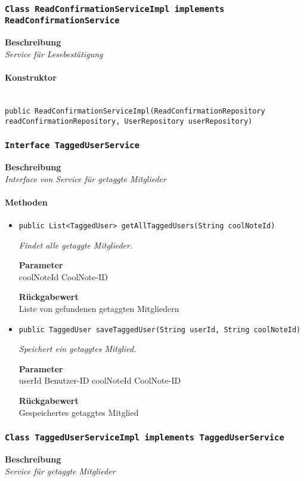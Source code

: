     \subsubsection{\texttt{Class ReadConfirmationServiceImpl implements ReadConfirmationService}}
    \textbf{Beschreibung} \\
    \textit{Service für Lesebestätigung}
    \paragraph*{Konstruktor}\mbox{} \\
    \texttt{public ReadConfirmationServiceImpl(ReadConfirmationRepository readConfirmationRepository, UserRepository userRepository)} \\
    \subsubsection{\texttt{Interface TaggedUserService}}
    \textbf{Beschreibung} \\
    \textit{Interface von Service für getaggte Mitglieder}
    \paragraph*{Methoden}
    \begin{itemize}
    	\item{\texttt{public List<TaggedUser> getAllTaggedUsers(String coolNoteId)}}
    	
    	\textit{Findet alle getaggte Mitglieder.}
    	
    	\textbf{Parameter} \\
    	coolNoteId CoolNote-ID
    	
    	\textbf{Rückgabewert} \\
    	Liste von gefundenen getaggten Mitgliedern        \item{\texttt{public TaggedUser saveTaggedUser(String userId, String coolNoteId)}}
    	
    	\textit{Speichert ein getaggtes Mitglied.}
    	
    	\textbf{Parameter} \\
    	userId Benutzer-ID
    	coolNoteId CoolNote-ID
    	
    	\textbf{Rückgabewert} \\
    	Gespeichertes getaggtes Mitglied
    \end{itemize}
    \subsubsection{\texttt{Class TaggedUserServiceImpl implements TaggedUserService}}
    \textbf{Beschreibung} \\
    \textit{Service für getaggte Mitglieder}
